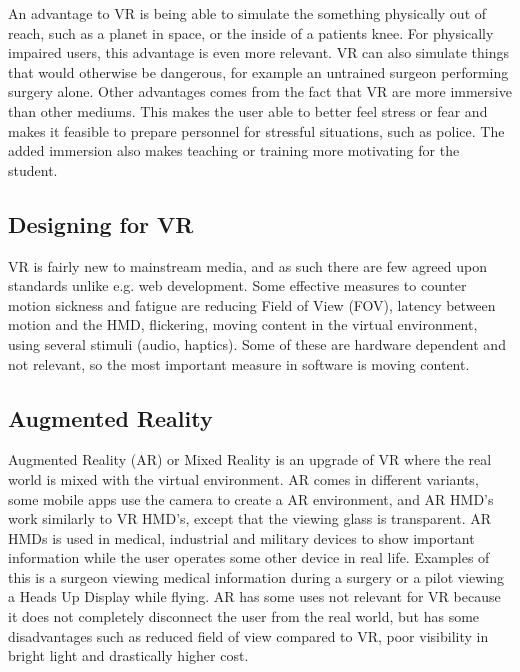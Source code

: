 \documentclass[a4paper]{report}
\begin{document}
An advantage to VR is being able to simulate the something physically out of reach, such as a planet in space, or the inside of a patients knee. For physically impaired users, this advantage is even more relevant.
VR can also simulate things that would otherwise be dangerous, for example an untrained surgeon performing surgery alone.
Other advantages comes from the fact that VR are more immersive than other mediums. This makes the user able to better feel stress or fear and makes it feasible to prepare personnel for stressful situations, such as police.
The added immersion also makes teaching or training more motivating for the student.\cite{freina_immersive_2015}

\subsection{Designing for VR}
VR is fairly new to mainstream media, and as such there are few agreed upon standards unlike e.g. web development.
Some effective measures to counter motion sickness and fatigue are reducing Field of View (FOV), latency between motion and the HMD, flickering, moving content in the virtual environment, using several stimuli (audio, haptics)\cite{chang_virtual_2020}. Some of these are hardware dependent and not relevant, so the most important measure in software is moving content. 

\subsection{ Augmented Reality }
Augmented Reality (AR) or Mixed Reality is an upgrade of VR where the real world is mixed with the virtual environment\cite{hackett_three-dimensional_2016}. AR comes in different variants, some mobile apps use the camera to create a AR environment, and AR HMD's work similarly to VR HMD's, except that the viewing glass is transparent.
AR HMDs is used in medical, industrial and military devices to show important information while the user operates some other device in real life. Examples of this is a surgeon viewing medical information during a surgery or a pilot viewing a Heads Up Display while flying\cite{mihelj_virtual_2014}.
AR has some uses not relevant for VR because it does not completely disconnect the user from the real world, but has some disadvantages such as reduced field of view compared to VR, poor visibility in bright light\cite{hackett_three-dimensional_2016} and drastically higher cost\cite{medical_holodeck_medicalholodeck_nodate}.
\end{document}

